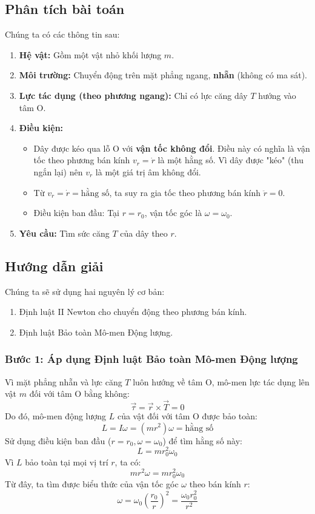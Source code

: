 \documentclass[12pt, a4paper]{article}
\begin{document}
\subsection*{Phân tích bài toán}
Chúng ta có các thông tin sau:
\begin{enumerate}
	\item \textbf{Hệ vật:} Gồm một vật nhỏ khối lượng $m$.
	\item \textbf{Môi trường:} Chuyển động trên mặt phẳng ngang, \textbf{nhẵn} (không có ma sát).
	\item \textbf{Lực tác dụng (theo phương ngang):} Chỉ có lực căng dây $T$ hướng vào tâm O.
	\item \textbf{Điều kiện:}
	\begin{itemize}
		\item Dây được kéo qua lỗ O với \textbf{vận tốc không đổi}. Điều này có nghĩa là vận tốc theo phương bán kính $v_r = \dot{r}$ là một hằng số. Vì dây được "kéo" (thu ngắn lại) nên $v_r$ là một giá trị âm không đổi.
		\item Từ $v_r = \dot{r} = \text{hằng số}$, ta suy ra gia tốc theo phương bán kính $\ddot{r} = 0$.
		\item Điều kiện ban đầu: Tại $r = r_0$, vận tốc góc là $\omega = \omega_0$.
	\end{itemize}
	\item \textbf{Yêu cầu:} Tìm sức căng $T$ của dây theo $r$.
\end{enumerate}

\subsection*{Hướng dẫn giải}
Chúng ta sẽ sử dụng hai nguyên lý cơ bản:
\begin{enumerate}
	\item Định luật II Newton cho chuyển động theo phương bán kính.
	\item Định luật Bảo toàn Mô-men Động lượng.
\end{enumerate}

\subsubsection*{Bước 1: Áp dụng Định luật Bảo toàn Mô-men Động lượng}
Vì mặt phẳng nhẵn và lực căng $T$ luôn hướng về tâm O, mô-men lực tác dụng lên vật $m$ đối với tâm O bằng không:
$$ \vec{\tau} = \vec{r} \times \vec{T} = 0 $$
Do đó, mô-men động lượng $L$ của vật đối với tâm O được bảo toàn:
$$ L = I \omega = (m r^2) \omega = \text{hằng số} $$
Sử dụng điều kiện ban đầu ($r = r_0, \omega = \omega_0$) để tìm hằng số này:
$$ L = m r_0^2 \omega_0 $$
Vì $L$ bảo toàn tại mọi vị trí $r$, ta có:
$$ m r^2 \omega = m r_0^2 \omega_0 $$
Từ đây, ta tìm được biểu thức của vận tốc góc $\omega$ theo bán kính $r$:
$$ \omega = \omega_0 \left( \frac{r_0}{r} \right)^2 = \frac{\omega_0 r_0^2}{r^2} $$
\end{document}
